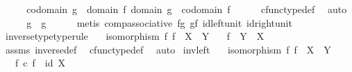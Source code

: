 \begin{isabellebody}
\ \ \isamarkupfalse%
\ \isamarkupfalse%
\ {\isachardoublequoteopen}codomain\ g{}\ {\isacharequal}{\kern0pt}\ domain\ f{\isachardoublequoteclose}\ {\isachardoublequoteopen}domain\ g{}\ {\isacharequal}{\kern0pt}\ codomain\ f{\isachardoublequoteclose}\isanewline
\ \ \ \ \isamarkupfalse%
\ cfunc{\isacharunderscore}{\kern0pt}type{\isacharunderscore}{\kern0pt}def\ \isamarkupfalse%
\ auto\isanewline
\ \ \isamarkupfalse%
\ \isamarkupfalse%
\ {\isachardoublequoteopen}g{}\ {\isacharequal}{\kern0pt}\ g{}{\isachardoublequoteclose}\isanewline
\ \ \ \ \isamarkupfalse%
\ {\isacharparenleft}{\kern0pt}metis\ comp{\isacharunderscore}{\kern0pt}associative\ f{\isacharunderscore}{\kern0pt}g{}\ g{}{\isacharunderscore}{\kern0pt}f\ id{\isacharunderscore}{\kern0pt}left{\isacharunderscore}{\kern0pt}unit\ id{\isacharunderscore}{\kern0pt}right{\isacharunderscore}{\kern0pt}unit{\isacharparenright}{\kern0pt}\isanewline
{}\isamarkupfalse%
%
\endisatagproof
{\isafoldproof}%
%
\isadelimproof
\isanewline
%
\endisadelimproof
\isanewline
{}\isamarkupfalse%
\ inverse{\isacharunderscore}{\kern0pt}type{\isacharbrackleft}{\kern0pt}type{\isacharunderscore}{\kern0pt}rule{\isacharbrackright}{\kern0pt}{\isacharcolon}{\kern0pt}\isanewline
\ \ \ {\isachardoublequoteopen}isomorphism\ f{\isachardoublequoteclose}\ {\isachardoublequoteopen}f\ {\isacharcolon}{\kern0pt}\ X\ {\isasymrightarrow}\ Y{\isachardoublequoteclose}\isanewline
\ \ \ {\isachardoublequoteopen}f\isactrlbold {\isasyminverse}\ {\isacharcolon}{\kern0pt}\ Y\ {\isasymrightarrow}\ X{\isachardoublequoteclose}\isanewline
%
\isadelimproof
\ \ %
\endisadelimproof
%
\isatagproof
{}\isamarkupfalse%
\ assms\ inverse{\isacharunderscore}{\kern0pt}def{}\ \isamarkupfalse%
\ cfunc{\isacharunderscore}{\kern0pt}type{\isacharunderscore}{\kern0pt}def\ \isamarkupfalse%
\ auto%
\endisatagproof
{\isafoldproof}%
%
\isadelimproof
\isanewline
%
\endisadelimproof
\isanewline
{}\isamarkupfalse%
\ inv{\isacharunderscore}{\kern0pt}left{\isacharcolon}{\kern0pt}\isanewline
\ \ \ {\isachardoublequoteopen}isomorphism\ f{\isachardoublequoteclose}\ {\isachardoublequoteopen}f\ {\isacharcolon}{\kern0pt}\ X\ {\isasymrightarrow}\ Y{\isachardoublequoteclose}\isanewline
\ \ \ {\isachardoublequoteopen}f\isactrlbold {\isasyminverse}\ {\isasymcirc}\isactrlsub c\ f\ {\isacharequal}{\kern0pt}\ id\ X{\isachardoublequoteclose}\isanewline

\end{isabellebody}
